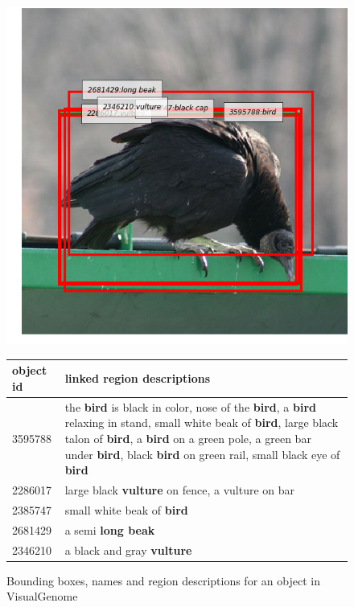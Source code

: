 \begin{figure}
\begin{center}
\includegraphics[scale=0.4]{figures/vulture.png} 
\begin{tabular}{lp{6cm}}
object id & linked region descriptions\\
\hline
3595788 & the \textbf{bird} is black in color, nose of the \textbf{bird}, a \textbf{bird} relaxing in stand, small white beak of \textbf{bird}, large black talon of \textbf{bird}, a \textbf{bird} on a green pole, a green bar under \textbf{bird}, black \textbf{bird} on green rail, small black eye of \textbf{bird}\\
2286017 & large black \textbf{vulture} on fence, a vulture on bar\\
2385747 & small white beak of \textbf{bird}\\
2681429 & a semi \textbf{long beak}\\  
2346210 & a black and gray \textbf{vulture}\\
 \end{tabular}
\caption{Bounding boxes, names and region descriptions for an object in VisualGenome}
\label{fig:bird}
\end{center}
\end{figure}

